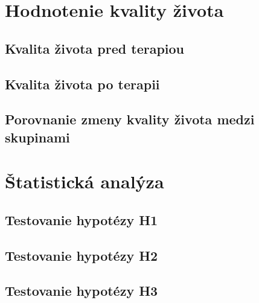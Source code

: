 \section{Hodnotenie kvality života}


\subsection{Kvalita života pred terapiou}


\subsection{Kvalita života po terapii}


\subsection{Porovnanie zmeny kvality života medzi skupinami}


\section{Štatistická analýza}


\subsection{Testovanie hypotézy H1}


\subsection{Testovanie hypotézy H2}


\subsection{Testovanie hypotézy H3}


\clearpage
